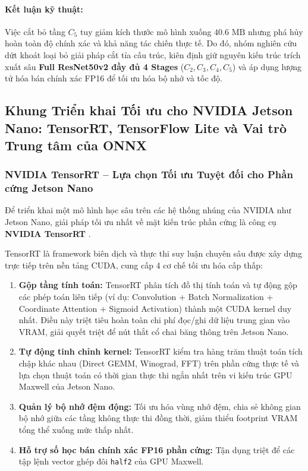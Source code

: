 \documentclass[11pt,a4paper]{article}
\begin{document}
\paragraph{Kết luận kỹ thuật:} Việc cắt bỏ tầng $C_5$ tuy giảm kích thước mô hình xuống $40.6\text{ MB}$ nhưng phá hủy hoàn toàn độ chính xác và khả năng tác chiến thực tế. Do đó, nhóm nghiên cứu dứt khoát loại bỏ giải pháp cắt tỉa cấu trúc, kiên định giữ nguyên kiến trúc trích xuất sâu \textbf{Full ResNet50v2 đầy đủ 4 Stages} ($C_2, C_3, C_4, C_5$) và áp dụng lượng tử hóa bán chính xác FP16 để tối ưu hóa bộ nhớ và tốc độ.

\subsection[Khung Triển khai Tối ưu cho Jetson Nano: TensorRT, TFLite và ONNX]{Khung Triển khai Tối ưu cho NVIDIA Jetson Nano: TensorRT, TensorFlow Lite và Vai trò Trung tâm của ONNX}
\label{subsec:edge_frameworks_onnx}

\subsubsection{NVIDIA TensorRT -- Lựa chọn Tối ưu Tuyệt đối cho Phần cứng Jetson Nano}
Để triển khai một mô hình học sâu trên các hệ thống nhúng của NVIDIA như Jetson Nano, giải pháp tối ưu nhất về mặt kiến trúc phần cứng là công cụ \textbf{NVIDIA TensorRT} \cite{tensorrt2021}. 

TensorRT là framework biên dịch và thực thi suy luận chuyên sâu được xây dựng trực tiếp trên nền tảng CUDA, cung cấp 4 cơ chế tối ưu hóa cấp thấp:
\begin{enumerate}
    \item \textbf{Gộp tầng tính toán:} TensorRT phân tích đồ thị tính toán và tự động gộp các phép toán liên tiếp (ví dụ: Convolution + Batch Normalization + Coordinate Attention + Sigmoid Activation) thành một CUDA kernel duy nhất. Điều này triệt tiêu hoàn toàn chi phí đọc/ghi dữ liệu trung gian vào VRAM, giải quyết triệt để nút thắt cổ chai băng thông trên Jetson Nano.
    \item \textbf{Tự động tinh chỉnh kernel:} TensorRT kiểm tra hàng trăm thuật toán tích chập khác nhau (Direct GEMM, Winograd, FFT) trên phần cứng thực tế và lựa chọn thuật toán có thời gian thực thi ngắn nhất trên vi kiến trúc GPU Maxwell của Jetson Nano.
    \item \textbf{Quản lý bộ nhớ đệm động:} Tối ưu hóa vùng nhớ đệm, chia sẻ không gian bộ nhớ giữa các tầng không thực thi đồng thời, giảm thiểu footprint VRAM tổng thể xuống mức thấp nhất.
    \item \textbf{Hỗ trợ số học bán chính xác FP16 phần cứng:} Tận dụng triệt để các tập lệnh vector ghép đôi \texttt{half2} của GPU Maxwell.
\end{enumerate}
\end{document}
